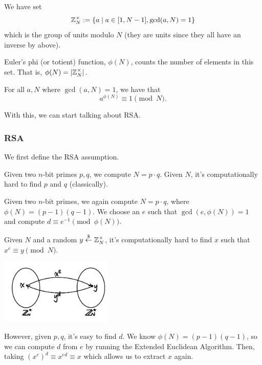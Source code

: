 \begin{definition}
    We have set
    \[\mathbb Z_N^\times:= \left\{ a\mid a\in [1, N-1], \gcd(a, N) = 1 \right\}\]
    which is the group of units modulo $N$ (they are units since they all have an inverse by above).
\end{definition}
\begin{definition}
    Euler's phi (or totient) function, $\phi(N)$, counts the number of elements in this set. That is, $\phi(N) =  |\mathbb Z_N^\times|$.
\end{definition}
\begin{theorem}
    For all $a, N$ where $\gcd(a, N) = 1$, we have that \[a^{\phi(N)} \equiv 1\pmod{N}.\]
\end{theorem}

With this, we can start talking about RSA.

\subsubsection{RSA}
We first define the RSA assumption.
\begin{definition}
    Given two $n$-bit primes $p, q$, we compute $N = p\cdot q$. Given $N$, it's computationally hard to find $p$ and $q$ (classically).
\end{definition}
\begin{definition}
    Given two $n$-bit primes, we again compute $N = p\cdot q$, where $\phi(N) = (p-1)(q-1)$. We choose an $e$ such that $\gcd(e, \phi(N)) = 1$ and compute $d \equiv e^{-1}\pmod{\phi(N)}$.

    Given $N$ and a random $y\overset{\$}{\leftarrow} \mathbb Z_{N}^\times$, it's computationally hard to find $x$ such that $x^e\equiv y\pmod{N}$.

    \begin{center}
        \includegraphics[width=0.4\textwidth]{images/2023-01-31/rsa.png}
    \end{center}

    However, given $p, q$, it's easy to find $d$. We know $\phi(N) = (p-1)(q-1)$, so we can compute $d$ from $e$ by running the Extended Euclidean Algorithm. Then, taking $(x^e)^d\equiv x^{ed}\equiv x$ which allows us to extract $x$ again.
\end{definition}

